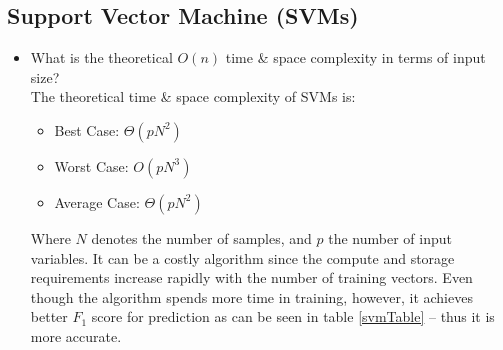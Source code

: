 \documentclass[12pt]{article}
\begin{document}
\subsection*{Support Vector Machine (SVMs)}
\begin{itemize}
\item What is the theoretical $O(n)$ time \& space complexity in terms of input size?\\
The theoretical time \& space complexity of SVMs is:
\begin{itemize}[noitemsep,nolistsep]
\item Best Case: $\Theta(pN^2)$ 
\item Worst Case: $O(pN^3)$
\item Average Case: $\Theta(pN^2)$
\end{itemize}
Where $N$ denotes the number of samples, and $p$ the number of input variables. 
It can be a costly algorithm since the compute and storage requirements increase rapidly with the number of training vectors. Even though the algorithm spends more time in training, however, it achieves better $ F_1$ score for prediction as can be seen in table \ref{svmTable} – thus it is more accurate.


\end{itemize}
\end{document}
